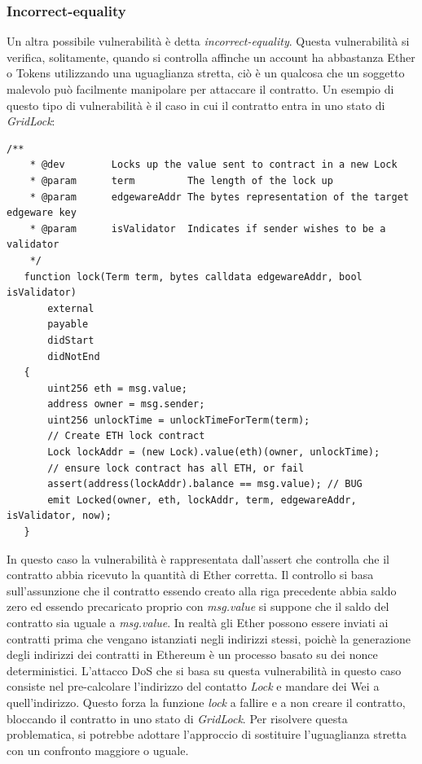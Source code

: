 \documentclass[../../Thesis.tex]{subfiles}
\begin{document}
\subsubsection*{Incorrect-equality}
Un altra possibile vulnerabilità è detta \emph{incorrect-equality}. Questa vulnerabilità si verifica, solitamente, quando si controlla affinche un account ha abbastanza Ether o Tokens utilizzando una uguaglianza stretta, ciò è un qualcosa che un soggetto malevolo può facilmente manipolare per attaccare il contratto. Un esempio di questo tipo di vulnerabilità è il caso in cui il contratto entra in uno stato di \emph{GridLock}:
\begin{lstlisting}[language=Solidity]
    /**
    * @dev        Locks up the value sent to contract in a new Lock
    * @param      term         The length of the lock up
    * @param      edgewareAddr The bytes representation of the target edgeware key
    * @param      isValidator  Indicates if sender wishes to be a validator
    */
   function lock(Term term, bytes calldata edgewareAddr, bool isValidator)
       external
       payable
       didStart
       didNotEnd
   {
       uint256 eth = msg.value;
       address owner = msg.sender;
       uint256 unlockTime = unlockTimeForTerm(term);
       // Create ETH lock contract
       Lock lockAddr = (new Lock).value(eth)(owner, unlockTime);
       // ensure lock contract has all ETH, or fail
       assert(address(lockAddr).balance == msg.value); // BUG
       emit Locked(owner, eth, lockAddr, term, edgewareAddr, isValidator, now);
   }
\end{lstlisting}
In questo caso la vulnerabilità è rappresentata dall'assert che controlla che il contratto abbia ricevuto la quantità di Ether corretta. Il controllo si basa sull'assunzione che il contratto essendo creato alla riga precedente abbia saldo zero ed essendo precaricato proprio con \emph{msg.value} si suppone che il saldo del contratto sia uguale a \emph{msg.value}. In realtà gli Ether possono essere inviati ai contratti prima che vengano istanziati negli indirizzi stessi, poichè la generazione degli indirizzi dei contratti in Ethereum è un processo basato su dei nonce deterministici. L'attacco DoS che si basa su questa vulnerabilità in questo caso consiste nel pre-calcolare l'indirizzo del contatto \emph{Lock} e mandare dei Wei a quell'indirizzo. Questo forza la funzione \emph{lock} a fallire e a non creare il contratto, bloccando il contratto in uno stato di \emph{GridLock}.  Per risolvere questa problematica, si potrebbe adottare l'approccio di sostituire l'uguaglianza stretta con un confronto maggiore o uguale. 
\end{document}

